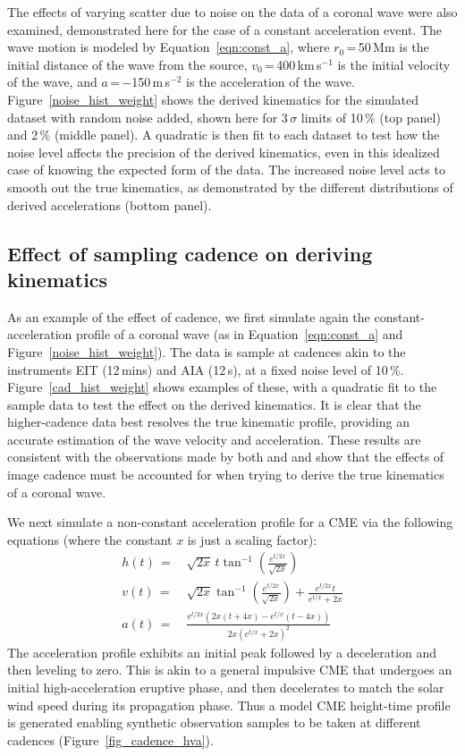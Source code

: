 \documentclass[structabstract]{aa}
\begin{document}
The effects of varying scatter due to noise on the data of a coronal wave were also examined, demonstrated here for the case of a constant acceleration event. The wave motion is modeled by Equation~\ref{eqn:const_a}, where $r_0$\,=\,50\,Mm is the initial distance of the wave from the source, $v_0$\,=\,400\,km\,s$^{-1}$ is the initial velocity of the wave, and $a$\,=\,$-$150\,m\,s$^{-2}$ is the acceleration of the wave. Figure~\ref{noise_hist_weight} shows the derived kinematics for the simulated dataset with random noise added, shown here for 3\,$\sigma$ limits of 10\,\% (top panel) and 2\,\% (middle panel). A quadratic is then fit to each dataset to test how the noise level affects the precision of the derived kinematics, even in this idealized case of knowing the expected form of the data. The increased noise level acts to smooth out the true kinematics, as demonstrated by the different distributions of derived accelerations (bottom panel).

\subsection{Effect of sampling cadence on deriving kinematics}
\label{subsect:test_lagrange_nonconst}


As an example of the effect of cadence, we first simulate again the constant-acceleration profile of a coronal wave (as in Equation~\ref{eqn:const_a} and Figure~\ref{noise_hist_weight}). The data is sample at cadences akin to the instruments EIT (12\,mins) and AIA (12\,s), at a fixed noise level of 10\,\%. Figure~\ref{cad_hist_weight} shows examples of these, with a quadratic fit to the sample data to test the effect on the derived kinematics. It is clear that the higher-cadence data best resolves the true kinematic profile, providing an accurate estimation of the wave velocity and acceleration. These results are consistent with the observations made by both \citet{2008ApJ...680L..81L} and \citet{2009ApJ...707..503M} and show that the effects of image cadence must be accounted for when trying to derive the true kinematics of a coronal wave.


We next simulate a non-constant acceleration profile for a CME via the following equations (where the constant $x$ is just a scaling factor):
\begin{eqnarray}
h(t)\,=&\,\sqrt{2x}\,t\tan^{-1}\left(\frac{e^{t/2x}}{\sqrt{2x}}\right) \\
v(t)\,=&\,\sqrt{2x}\tan^{-1}\left(\frac{e^{t/2x}}{\sqrt{2x}}\right)+\frac{e^{t/2x}t}{e^{t/x}+2x} \\
a(t)\,=&\,\frac{e^{t/2x}\left(2x\left(t+4x\right)-e^{t/x}\left(t-4x\right)\right)}{2x\left(e^{t/x}+2x\right)^2}
\end{eqnarray}
The acceleration profile exhibits an initial peak followed by a deceleration and then leveling to zero. This is akin to a general impulsive CME that undergoes an initial high-acceleration eruptive phase, and then decelerates to match the solar wind speed during its propagation phase. Thus a model CME height-time profile is generated enabling synthetic observation samples to be taken at different cadences (Figure~\ref{fig_cadence_hva}). 
\end{document}
